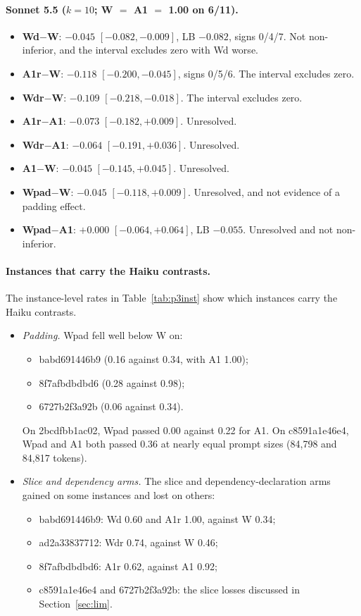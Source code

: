 \paragraph{Sonnet 5.5 ($k=10$; W $=$ A1 $=$ 1.00 on 6/11).}
\begin{itemize}
\item \textbf{Wd$-$W}: $-0.045$ $[-0.082, -0.009]$, LB $-0.082$, signs 0/4/7. Not non-inferior, and the interval excludes zero with Wd worse.
\item \textbf{A1r$-$W}: $-0.118$ $[-0.200, -0.045]$, signs 0/5/6. The interval excludes zero.
\item \textbf{Wdr$-$W}: $-0.109$ $[-0.218, -0.018]$. The interval excludes zero.
\item \textbf{A1r$-$A1}: $-0.073$ $[-0.182, +0.009]$. Unresolved.
\item \textbf{Wdr$-$A1}: $-0.064$ $[-0.191, +0.036]$. Unresolved.
\item \textbf{A1$-$W}: $-0.045$ $[-0.145, +0.045]$. Unresolved.
\item \textbf{Wpad$-$W}: $-0.045$ $[-0.118, +0.009]$. Unresolved, and not evidence of a padding effect.
\item \textbf{Wpad$-$A1}: $+0.000$ $[-0.064, +0.064]$, LB $-0.055$. Unresolved and not non-inferior.
\end{itemize}

\paragraph{Instances that carry the Haiku contrasts.} The instance-level rates in Table~\ref{tab:p3inst} show which instances carry the Haiku contrasts.
\begin{itemize}
\item \emph{Padding.} Wpad fell well below W on:
  \begin{itemize}
  \item babd691446b9 (0.16 against 0.34, with A1 1.00);
  \item 8f7afbdbdbd6 (0.28 against 0.98);
  \item 6727b2f3a92b (0.06 against 0.34).
  \end{itemize}
  On 2bcdfbb1ac02, Wpad passed 0.00 against 0.22 for A1. On c8591a1e46e4, Wpad and A1 both passed 0.36 at nearly equal prompt sizes (84,798 and 84,817 tokens).
\item \emph{Slice and dependency arms.} The slice and dependency-declaration arms gained on some instances and lost on others:
  \begin{itemize}
  \item babd691446b9: Wd 0.60 and A1r 1.00, against W 0.34;
  \item ad2a33837712: Wdr 0.74, against W 0.46;
  \item 8f7afbdbdbd6: A1r 0.62, against A1 0.92;
  \item c8591a1e46e4 and 6727b2f3a92b: the slice losses discussed in Section~\ref{sec:lim}.
  \end{itemize}
\end{itemize}

